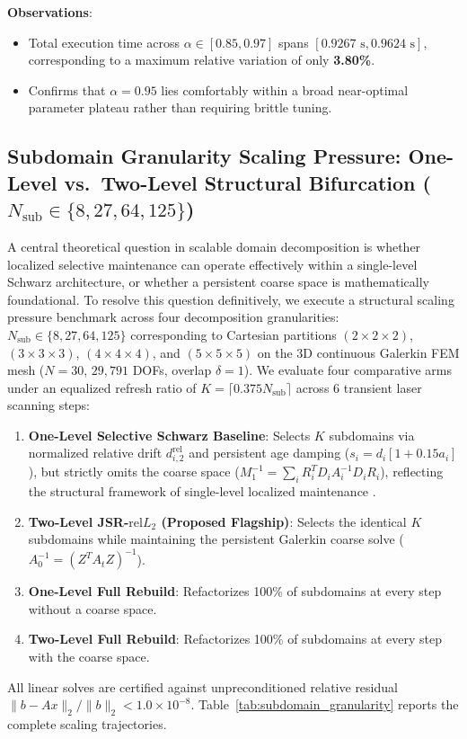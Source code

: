 \documentclass[preprint,12pt,3p]{elsarticle}
\begin{document}
\textbf{Observations}:
\begin{itemize}
    \item Total execution time across $\alpha \in [0.85, 0.97]$ spans $[0.9267\text{ s}, 0.9624\text{ s}]$, corresponding to a maximum relative variation of only \textbf{3.80\%}.
    \item Confirms that $\alpha = 0.95$ lies comfortably within a broad near-optimal parameter plateau rather than requiring brittle tuning.
\end{itemize}

\subsection{Subdomain Granularity Scaling Pressure: One-Level vs.\ Two-Level Structural Bifurcation ($N_{\text{sub}} \in \{8, 27, 64, 125\}$)}
\label{subsec:res_granularity}

A central theoretical question in scalable domain decomposition is whether localized selective maintenance can operate effectively within a single-level Schwarz architecture, or whether a persistent coarse space is mathematically foundational. To resolve this question definitively, we execute a structural scaling pressure benchmark across four decomposition granularities: $N_{\text{sub}} \in \{8, 27, 64, 125\}$ corresponding to Cartesian partitions $(2\times 2\times 2)$, $(3\times 3\times 3)$, $(4\times 4\times 4)$, and $(5\times 5\times 5)$ on the 3D continuous Galerkin FEM mesh ($N=30$, $29{,}791$ DOFs, overlap $\delta=1$). We evaluate four comparative arms under an equalized refresh ratio of $K = \lceil 0.375 N_{\text{sub}} \rceil$ across 6 transient laser scanning steps:
\begin{enumerate}
    \item \textbf{One-Level Selective Schwarz Baseline}: Selects $K$ subdomains via normalized relative drift $d_{i, 2}^{\text{rel}}$ and persistent age damping ($s_i = d_i [1 + 0.15 a_i]$), but strictly omits the coarse space ($M_1^{-1} = \sum_i R_i^T D_i A_i^{-1} D_i R_i$), reflecting the structural framework of single-level localized maintenance \cite{svolos2020updating}.
    \item \textbf{Two-Level JSR-$\text{rel}L_2$ (Proposed Flagship)}: Selects the identical $K$ subdomains while maintaining the persistent Galerkin coarse solve ($A_0^{-1} = (Z^T A_t Z)^{-1}$).
    \item \textbf{One-Level Full Rebuild}: Refactorizes 100\% of subdomains at every step without a coarse space.
    \item \textbf{Two-Level Full Rebuild}: Refactorizes 100\% of subdomains at every step with the coarse space.
\end{enumerate}
All linear solves are certified against unpreconditioned relative residual $\|b - A x\|_2 / \|b\|_2 < 1.0 \times 10^{-8}$. Table~\ref{tab:subdomain_granularity} reports the complete scaling trajectories.
\end{document}
